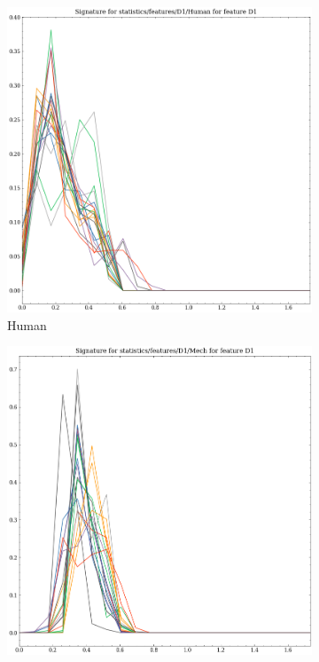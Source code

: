 \begin{figure}[t!p]
    \begin{subfigure}[b]{0.23\textwidth}
        \includegraphics[width=\textwidth]{assets/feature_extraction/D1/Human.png}
        \caption{Human}
        \label{fig:features-statistics-D1-q}    
    \end{subfigure}
    \hfill
    \begin{subfigure}[b]{0.23\textwidth}
        \includegraphics[width=\textwidth]{assets/feature_extraction/D1/Mech.png}

\end{subfigure}
\end{figure}
